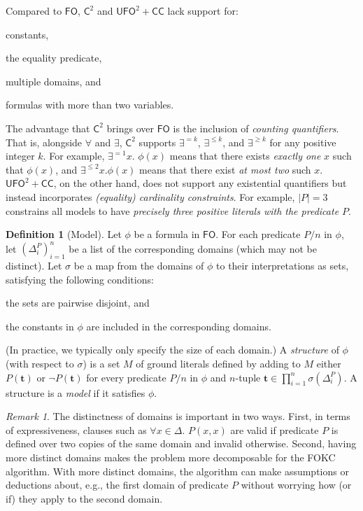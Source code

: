 \documentclass[letterpaper]{article} %
\theoremstyle{remark}
\newtheorem*{remark}{Remark}
\theoremstyle{definition}
\newtheorem{definition}{Definition}
\newcommand{\Ctwo}{$\mathsf{C}^{2}$}
\newcommand{\FO}{$\mathsf{FO}$}
\newcommand{\UFO}{$\mathsf{UFO}^{2} + \mathsf{CC}$}
\begin{document}
Compared to \FO{}, \Ctwo{} and \UFO{} lack support for:
\begin{enumerate*}[label=(\roman*)]
  \item constants,
  \item the equality predicate,
  \item multiple domains, and
  \item formulas with more than two variables.
\end{enumerate*}
The advantage that \Ctwo{} brings over \FO{} is the inclusion of \emph{counting
  quantifiers}. That is, alongside $\forall$ and $\exists$, \Ctwo{} supports
$\exists^{=k}$, $\exists^{\le k}$, and $\exists^{\ge k}$ for any positive
integer $k$. For example, $\exists^{=1} x\text{. }\phi(x)$ means that there
exists \emph{exactly one} $x$ such that $\phi(x)$, and $\exists^{\le 2} x\text{.
}\phi(x)$ means that there exist \emph{at most two} such $x$. \UFO{}, on the
other hand, does not support any existential quantifiers but instead
incorporates \emph{(equality) cardinality constraints}. For example, $|P| = 3$
constrains all models to have \emph{precisely three positive literals with the
  predicate $P$}.

\begin{definition}[Model]\label{def:model}
  Let $\phi$ be a formula in \FO{}. For each predicate $P/n$ in $\phi$, let
  ${(\Delta_{i}^{P})}_{i=1}^{n}$ be a list of the corresponding domains (which
  may not be distinct). Let $\sigma$ be a map from the domains of $\phi$ to
  their interpretations as sets, satisfying the following conditions:
  \begin{enumerate*}[label=(\roman*)]
    \item the sets are pairwise disjoint, and
    \item the constants in $\phi$ are included in the corresponding domains.
  \end{enumerate*}
  (In practice, we typically only specify the size of each domain.) A
  \emph{structure} of $\phi$ (with respect to $\sigma$) is a set $M$ of ground
  literals defined by adding to $M$ either $P(\mathbf{t})$ or
  $\neg P(\mathbf{t})$ for every predicate $P/n$ in $\phi$ and $n$-tuple
  $\mathbf{t} \in \prod_{i=1}^{n} \sigma(\Delta_{i}^{P})$. A structure is a
  \emph{model} if it satisfies $\phi$.
\end{definition}

\begin{remark}
  The distinctness of domains is important in two ways. First, in terms of
  expressiveness, clauses such as $\forall x \in \Delta\text{. }P(x, x)$ are
  valid if predicate $P$ is defined over two copies of the same domain and
  invalid otherwise. Second, having more distinct domains makes the problem more
  decomposable for the FOKC algorithm. With more distinct domains, the algorithm
  can make assumptions or deductions about, e.g., the first domain of predicate
  $P$ without worrying how (or if) they apply to the second domain.
\end{remark}
\end{document}
